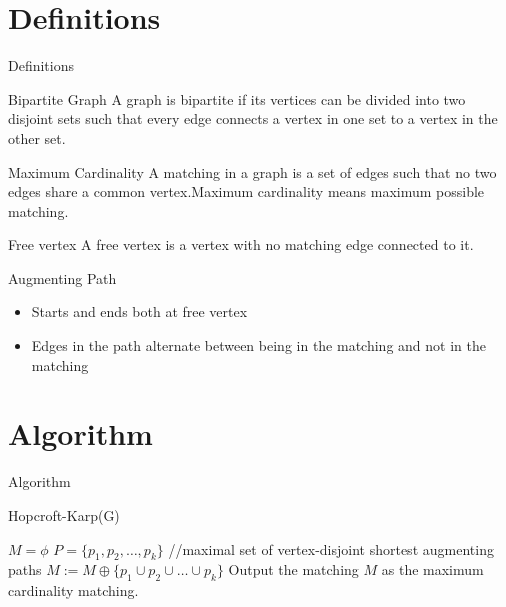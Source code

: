 \documentclass{beamer}
\begin{document}
\section{Definitions}
\begin{frame}{Definitions}
     \begin{block}{Bipartite Graph}
A graph is bipartite if its vertices can be divided into two disjoint sets such that every edge connects a vertex in one set to a vertex in the other set.
\end{block}
 \pause
\begin{block}{Maximum Cardinality}
A matching in a graph is a set of edges such that no two edges share a common vertex.Maximum cardinality means maximum possible matching.
\end{block} \pause
\begin{block}{Free vertex}
 A free vertex is a vertex with no matching edge connected to it.
\end{block} \pause

\begin{block}{Augmenting Path}
    \begin{itemize}
        \item Starts and ends both at free vertex
        \item Edges in the path alternate between being in the matching and not in the matching
    \end{itemize}
\end{block}
\end{frame}

\section{Algorithm}
\begin{frame}{Algorithm}
\renewcommand{\thealgorithm}{}
\begin{algorithm}[H]
\caption{Hopcroft-Karp(G)}
\begin{algorithmic}[1]
\State $M=\phi$ \pause
\Repeat 
\State $P=\{p_1,p_2,\dots,p_k\}$ {\tiny //maximal set of vertex-disjoint shortest augmenting paths} \pause
\State $M:=M\oplus\{p_1 \cup p_2 \cup \dots \cup p_k\}$\pause
{} \pause
\State Output the matching $M$ as the maximum cardinality matching.
\end{algorithmic}
\end{algorithm}
\end{frame}
\end{document}
